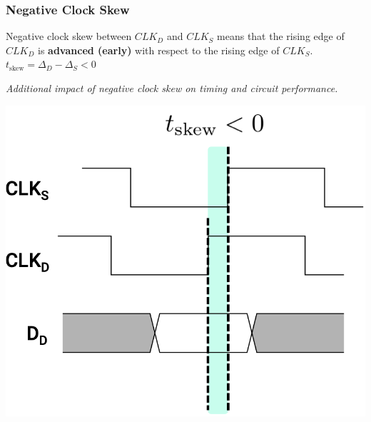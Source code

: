 \documentclass[12pt,openany]{book}
\begin{document}
\subsubsection{Negative Clock Skew}
\begin{minipage}{0.5\textwidth}
\begin{justify}
	Negative clock skew between $CLK_D$ and $CLK_S$ means that the rising edge of $CLK_D$ is \textbf{advanced (early)} with respect to the rising edge of $CLK_S$.
	$t_{\text{skew}} = \Delta_D - \Delta_S < 0$ \newline
\end{justify}
	\vspace*{5px}                
	\textit{Additional impact of negative clock skew on timing and circuit performance.}

\end{minipage}  \hfill
\vline
\hfill
\begin{minipage}{0.4\textwidth}
    \includegraphics[width=\textwidth]{circuits/15.5.1_3.png}
\end{minipage}
\end{document}
